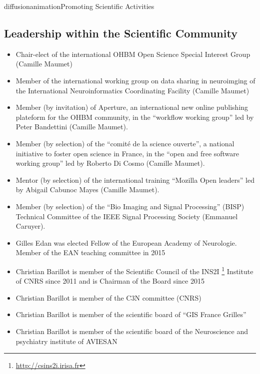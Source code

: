 \documentclass{ra2018}
\begin{document}
\begin{module}{diffusion}{animation}{Promoting Scientific Activities}
\subsection{Leadership within the Scientific Community}
\begin{itemize}
    \item Chair-elect of the international OHBM Open Science Special Interest Group (Camille Maumet)
    \item Member of the international working group on data sharing in neuroimging of the International Neuroinformatics Coordinating Facility (Camille Maumet)
    \item Member (by invitation) of Aperture, an international new online publishing plateform for the OHBM community, in the ``workflow working group'' led by Peter Bandettini  (Camille Maumet).
    \item Member (by selection) of the ``comité de la science ouverte'', a national initiative to foster open science in France, in the ``open and free software working group'' led by Roberto Di Cosmo  (Camille Maumet).
    \item Mentor (by selection) of the international training ``Mozilla Open leaders'' led by Abigail Cabunoc Mayes (Camille Maumet).
    \item Member (by selection) of the ``Bio Imaging and Signal Processing'' (BISP) Technical Committee of the IEEE Signal Processing Society (Emmanuel Caruyer).
     \item Gilles Edan was elected Fellow of the European Academy of Neurologie.
    Member of the EAN teaching committee in 2015
    \item Christian Barillot is member of the Scientific Council of the INS2I \footnote{\url{http://csins2i.irisa.fr}} Institute of CNRS since 2011 and is Chairman of the Board since 2015
    \item Christian Barillot is member of the C3N committee (CNRS)
    \item Christian Barillot is member of the scientific board of ``GIS France Grilles''
    \item Christian Barillot is member of the scientific board of the Neuroscience and psychiatry institute of AVIESAN
\end{itemize}    

\end{module}
\end{document}
